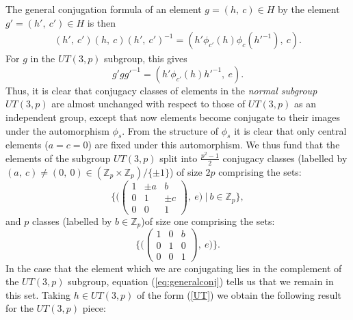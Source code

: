 \documentclass[12pt]{article}
\theoremstyle{definition}
\begin{document}
The general conjugation formula of an element $g = (h,~c) \in H$ by the element $g' = (h',~c') \in H$ is then
\begin{equation}
\begin{gathered}
(h',~c')(h,~c)(h',~c')^{-1}  = (h'\phi_{c'}(h)\phi_c(h'^{-1}),~c).
\end{gathered}
\label{eq:generalconj}
\end{equation}
For $g$ in the $UT(3,p)$ subgroup, this gives
\begin{equation}
g'gg'^{-1} = (h'\phi_{c'}(h)h'^{-1},~e).
\end{equation}
Thus, it is clear that conjugacy classes of elements in the {\it normal subgroup} $UT(3,p)$ are almost unchanged with respect to those of $UT(3,p)$ as an independent group, except that now elements become conjugate to their images under the automorphism $\phi_s$. From the structure of $\phi_s$ it is clear that only central elements ($a=c=0$) are fixed under this automorphism. We thus fund that the elements of the subgroup $UT(3,p)$ split into $\frac{p^2-1}{2}$ conjugacy classes (labelled by $(a,~c) \neq (0,~0) \in (\mathbb{Z}_p \times \mathbb{Z}_p)/\{\pm 1\}$) of size $2p$ comprising the sets:
\begin{equation}
\bigg\{ \bigg(
\begin{pmatrix}
1 & \pm a & b \\
0 & 1 & \pm c \\
0 & 0 & 1
\end{pmatrix},~e \bigg)~|~b \in \mathbb{Z}_p \bigg\},
\end{equation}
and $p$ classes (labelled by $b \in \mathbb{Z}_p$)of size one comprising the sets:
\begin{equation}
\bigg\{ \bigg(
\begin{pmatrix}
1 & 0 & b \\
0 & 1 & 0 \\
0 & 0 & 1
\end{pmatrix},~e \bigg) \bigg\}.
\end{equation}
In the case that the element which we are conjugating lies in the complement of the $UT(3,p)$ subgroup, equation (\ref{eq:generalconj}) tells us that we remain in this set. Taking $h \in UT(3,p)$ of the form (\ref{UT}) we obtain the following result for the $UT(3,p)$ piece:
\end{document}
